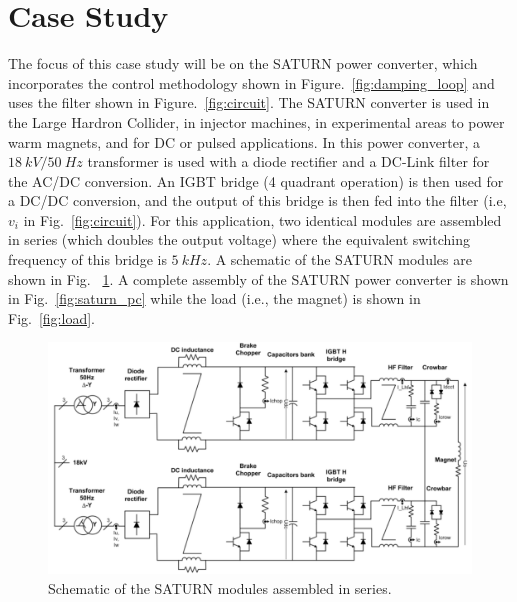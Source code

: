 \documentclass[a4paper, 10pt, conference]{ieeeconf}
\begin{document}
\section{Case Study}
\label{sec:case}
The focus of this case study will be on the SATURN power converter, which incorporates the control methodology shown in Figure.~\ref{fig:damping_loop} and uses the filter shown in Figure.~\ref{fig:circuit}. The SATURN converter is used in the Large Hardron Collider, in injector machines, in experimental areas to power warm magnets, and for DC or pulsed applications. In this power converter, a $18\:kV/50\:Hz$ transformer is used with a diode rectifier and a DC-Link filter for the AC/DC conversion. An IGBT bridge (4 quadrant operation) is then used for a DC/DC conversion, and the output of this bridge is then fed into the filter (i.e, $v_i$ in Fig.~\ref{fig:circuit}). For this application, two identical modules are assembled in series (which doubles the output voltage) where the equivalent switching frequency of this bridge is $5 \: kHz$. A schematic of the SATURN modules are shown in Fig.~ \ref{fig:schematic}. A complete assembly of the SATURN power converter is shown in Fig.~\ref{fig:saturn_pc} while the load (i.e., the magnet) is shown in Fig.~\ref{fig:load}.

\begin{figure}
\centering
\includegraphics[width=\columnwidth]{../pics/schematic}
\caption{Schematic of the SATURN modules assembled in series.}
\label{fig:schematic}
\end{figure} 
\end{document}
